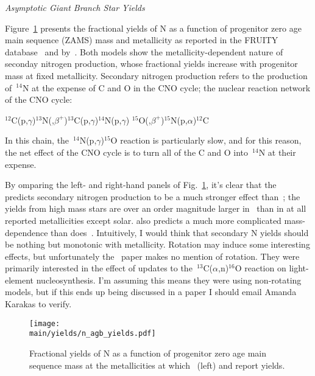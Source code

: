 \documentclass[\main/notes.tex]{subfiles}
\begin{document}
\twolineskip 
{\Large \textit{Asymptotic Giant Branch Star Yields}} 
\par\noindent 
Figure~\ref{fig:n_agb_yields} presents the fractional yields of N as a function 
of progenitor zero age main sequence (ZAMS) mass and metallicity as reported in 
the FRUITY database~\citep{Cristallo2011} and by~\citet{Karakas2010}. Both 
models show the metallicity-dependent nature of seconday nitrogen production, 
whose fractional yields increase with progenitor mass at fixed metallicity. 
Secondary nitrogen production refers to the production of~$^{14}$N at the 
expense of C and O in the CNO cycle; the nuclear reaction network of the CNO 
cycle: 

\twolineskip 
$^{12}$C(p,$\gamma$)$^{13}$N(,$\beta^+$)$^{13}$C(p,$\gamma$)$^{14}$N(p,$\gamma$)
$^{15}$O(,$\beta^+$)$^{15}$N(p,$\alpha$)$^{12}$C 

\twolineskip 
In this chain, the~$^{14}$N(p,$\gamma$)$^{15}$O reaction is particularly slow, 
and for this reason, the net effect of the CNO cycle is to turn all of the C 
and O into~$^{14}$N at their expense. 
\par 
By omparing the left- and right-hand panels of Fig.~\ref{fig:n_agb_yields}, 
it's clear that the~\citet{Karakas2010} predicts secondary nitrogen production 
to be a much stronger effect than~\citet{Cristallo2011}; the yields from high 
mass stars are over an order magnitude larger in~\citet{Karakas2010} than in 
\citet{Cristallo2011} at all reported metallicities except solar. 
\citet{Karakas2010} also predicts a much more complicated mass-dependence than 
does~\citet{Cristallo2011}. {\color{red} Intuitively, I would think that 
secondary N yields should be nothing but monotonic with metallicity. Rotation 
may induce some interesting effects, but unfortunately the~\citet{Karakas2010} 
paper makes no mention of rotation. They were primarily interested in the 
effect of updates to the~$^{13}$C($\alpha$,n)$^{16}$O reaction on light-element 
nucleosynthesis. I'm assuming this means they were using non-rotating models, 
but if this ends up being discussed in a paper I should email Amanda Karakas 
to verify. } 

\begin{figure}[!t]
\centering 
\texttt{[image: \\main/yields/n\_agb\_yields.pdf]} 
\caption{Fractional yields of N as a function of progenitor zero age main 
sequence mass at the metallicities at which~\citet{Cristallo2011} (left) and 
\citet{Karakas2010} report yields.} 
\label{fig:n_agb_yields} 
\end{figure} 

%   
%  
\biblio 
\end{document}
